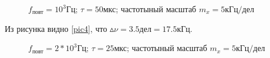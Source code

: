 \documentclass[a4paper,12pt]{article} %
\begin{document}
\begin{figure}[H]\label{pic4}
 	\caption{$f_\text{повт} = 10^3\text{Гц}$; $\tau = 50 \text{мкс}$; частотыный масштаб $m_x = 5 \text{кГц/дел}$}
\end{figure}

Из рисунка видно \eqref{pic4}, что $\vartriangle\nu = 3.5 \text{дел} = 17.5 \text{кГц}$.

\begin{figure}[H]\label{pic5}
 	\caption{$f_\text{повт} = 2 * 10^3\text{Гц}$; $\tau = 25 \text{мкс}$; частотыный масштаб $m_x = 5 \text{кГц/дел}$}
\end{figure}
\end{document}
